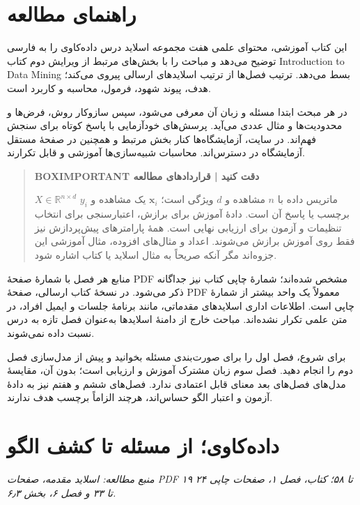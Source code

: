 


\chapter*{راهنمای مطالعه}

این کتاب آموزشی، محتوای علمی هفت مجموعه اسلاید درس داده‌کاوی را به فارسی توضیح می‌دهد و مباحث را با بخش‌های مرتبط از ویرایش دوم کتاب Introduction to Data Mining بسط می‌دهد. ترتیب فصل‌ها از ترتیب اسلایدهای ارسالی پیروی می‌کند؛ هدف، پیوند شهود، فرمول، محاسبه و کاربرد است.

در هر مبحث ابتدا مسئله و زبان آن معرفی می‌شود، سپس سازوکار روش، فرض‌ها و محدودیت‌ها و مثال عددی می‌آید. پرسش‌های خودآزمایی با پاسخ کوتاه برای سنجش فهم‌اند. در سایت، آزمایشگاه‌ها کنار بخش مرتبط و همچنین در صفحهٔ مستقل آزمایشگاه در دسترس‌اند. محاسبات شبیه‌سازی‌ها آموزشی و قابل تکرارند.

\begin{quote}\textbf{BOXIMPORTANT دقت کنید | قراردادهای مطالعه}\par 
$X\in\mathbb R^{n\times d}$ ماتریس داده با $n$ مشاهده و $d$ ویژگی است؛ $\mathbf x_i$ یک مشاهده و $y_i$ برچسب یا پاسخ آن است. دادهٔ آموزش برای برازش، اعتبارسنجی برای انتخاب تنظیمات و آزمون برای ارزیابی نهایی است. همهٔ پارامترهای پیش‌پردازش نیز فقط روی آموزش برازش می‌شوند. اعداد و مثال‌های افزوده، مثال آموزشی این جزوه‌اند مگر آنکه صریحاً به مثال اسلاید یا کتاب اشاره شود.
\end{quote}

منابع هر فصل با شمارهٔ صفحهٔ PDF مشخص شده‌اند؛ شمارهٔ چاپی کتاب نیز جداگانه ذکر می‌شود. در نسخهٔ کتاب ارسالی، صفحهٔ PDF معمولاً یک واحد بیشتر از شمارهٔ چاپی است. اطلاعات اداری اسلایدهای مقدماتی، مانند برنامهٔ جلسات و ایمیل افراد، در متن علمی تکرار نشده‌اند. مباحث خارج از دامنهٔ اسلایدها به‌عنوان فصل تازه به درس نسبت داده نمی‌شوند.

برای شروع، فصل اول را برای صورت‌بندی مسئله بخوانید و پیش از مدل‌سازی فصل دوم را انجام دهید. فصل سوم زبان مشترک آموزش و ارزیابی است؛ بدون آن، مقایسهٔ مدل‌های فصل‌های بعد معنای قابل اعتمادی ندارد. فصل‌های ششم و هفتم نیز به دادهٔ آزمون و اعتبار الگو حساس‌اند، هرچند الزاماً برچسب هدف ندارند.




\chapter{داده‌کاوی؛ از مسئله تا کشف الگو}
\textit{منبع مطالعه: اسلاید مقدمه، صفحات PDF ۱۹ تا ۵۸؛ کتاب، فصل ۱، صفحات چاپی ۲۴ تا ۳۳ و فصل ۶، بخش ۶٫۳.}\par 

